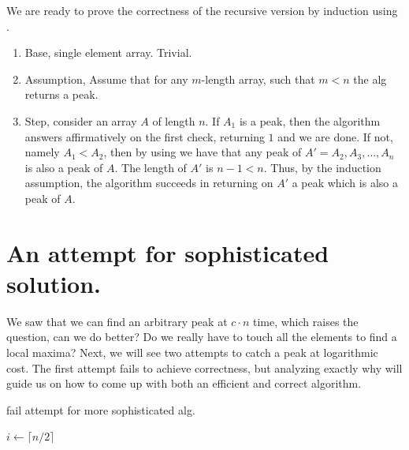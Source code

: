 %
%
%

We are ready to prove the correctness of the recursive version by induction using . 

\begin{enumerate}
  \item Base, single element array. Trivial. 
  \item Assumption, Assume that for any $m$-length array, such that $m<n$ the alg returns a peak. 
  \item Step, consider an array $A$ of length $n$. If $A_1$ is a peak, then the algorithm answers affirmatively on the first check, returning $1$ and we are done. If not, namely $A_1 < A_2$, then by using  we have that any peak of $A' = A_2, A_3, \dots, A_n$ is also a peak of $A$. The length of $A'$ is $n-1 < n$. Thus, by the induction assumption, the algorithm succeeds in returning on $A'$ a peak which is also a peak of $A$.
\end{enumerate}

\section{An attempt for sophisticated solution.}
We saw that we can find an arbitrary peak at $c\cdot n$ time, which raises the question, can we do better? Do we really have to touch all the elements to find a local maxima? Next, we will see two attempts to catch a peak at logarithmic cost. The first attempt fails to achieve correctness, but analyzing exactly why will guide us on how to come up with both an efficient and correct algorithm.
\begin{algorithm}
\caption{fail attempt for more sophisticated alg. }
        $ i \leftarrow  \lceil n/2 \rceil $\\
\end{algorithm}

